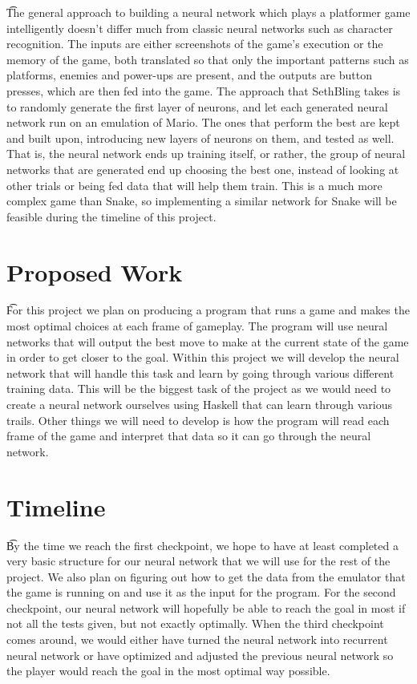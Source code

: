 \documentclass{sigplanconf}
\begin{document}
\t The general approach to building a neural network which plays a platformer game intelligently doesn't differ much from classic neural networks such as character recognition. The inputs are either screenshots of the game's execution or the memory of the game, both translated so that only the important patterns such as platforms, enemies and power-ups are present, and the outputs are button presses, which are then fed into the game. The approach that SethBling takes is to randomly generate the first layer of neurons, and let each generated neural network run on an emulation of Mario. The ones that perform the best are kept and built upon, introducing new layers of neurons on them, and tested as well. That is, the neural network ends up training itself, or rather, the group of neural networks that are generated end up choosing the best one, instead of looking at other trials or being fed data that will help them train. This is a much more complex game than Snake, so implementing a similar network for Snake will be feasible during the timeline of this project.

\section{Proposed Work}
\t For this project we plan on producing a program that runs a game and makes the most optimal choices at each frame of gameplay. The program will use neural networks that will output the best move to make at the current state of the game in order to get closer to the goal. Within this project we will develop the neural network that will handle this task and learn by going through various different training data. This will be the biggest task of the project as we would need to create a neural network ourselves using Haskell that can learn through various trails. Other things we will need to develop is how the program will read each frame of the game and interpret that data so it can go through the neural network.

\section{Timeline}
\t By the time we reach the first checkpoint, we hope to have at least completed a very basic structure for our neural network that we will use for the rest of the project. We also plan on figuring out how to get the data from the emulator that the game is running on and use it as the input for the program. For the second checkpoint, our neural network will hopefully be able to reach the goal in most if not all the tests given, but not exactly optimally. When the third checkpoint comes around, we would either have turned the neural network into recurrent neural network or have optimized and adjusted the previous neural network so the player would reach the goal in the most optimal way possible.
\end{document}

